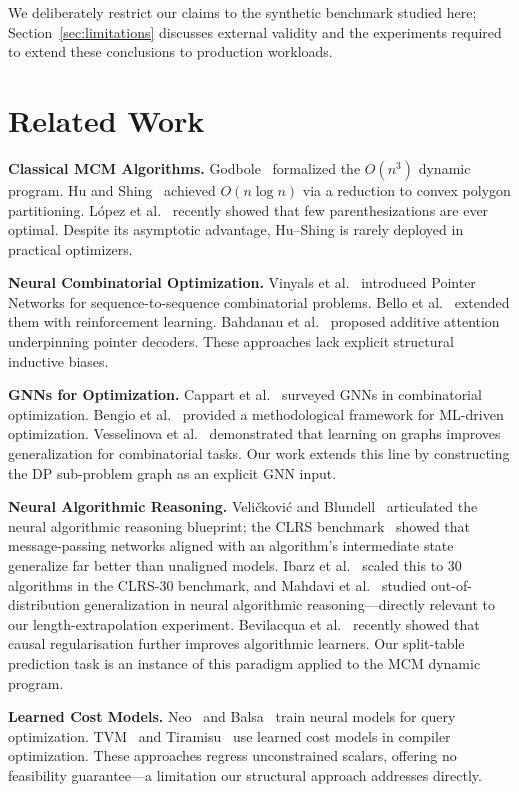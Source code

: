 \documentclass[conference]{IEEEtran}
\begin{document}
We deliberately restrict our claims to the synthetic benchmark studied here;
Section~\ref{sec:limitations} discusses external validity and the experiments
required to extend these conclusions to production workloads.

\section{Related Work}
\textbf{Classical MCM Algorithms.} Godbole~\cite{b1} formalized the $O(n^3)$
dynamic program. Hu and Shing~\cite{b2} achieved $O(n\log n)$ via a reduction
to convex polygon partitioning. L\'{o}pez et al.~\cite{b3} recently showed that
few parenthesizations are ever optimal. Despite its asymptotic advantage,
Hu--Shing is rarely deployed in practical optimizers.

\textbf{Neural Combinatorial Optimization.} Vinyals et al.~\cite{b7} introduced
Pointer Networks for sequence-to-sequence combinatorial problems. Bello
et al.~\cite{b8} extended them with reinforcement learning. Bahdanau
et al.~\cite{b9} proposed additive attention underpinning pointer decoders.
These approaches lack explicit structural inductive biases.

\textbf{GNNs for Optimization.} Cappart et al.~\cite{b20} surveyed GNNs in
combinatorial optimization. Bengio et al.~\cite{b21} provided a methodological
framework for ML-driven optimization. Vesselinova et al.~\cite{b22} demonstrated
that learning on graphs improves generalization for combinatorial tasks. Our work
extends this line by constructing the DP sub-problem graph as an explicit GNN input.

\textbf{Neural Algorithmic Reasoning.} Veli\v{c}kovi\'{c} and
Blundell~\cite{b25} articulated the neural algorithmic reasoning blueprint; the
CLRS benchmark~\cite{b26} showed that message-passing networks aligned with an
algorithm's intermediate state generalize far better than unaligned models.
Ibarz et al.~\cite{b27} scaled this to 30 algorithms in the CLRS-30
benchmark, and Mahdavi et al.~\cite{b28} studied out-of-distribution
generalization in neural algorithmic reasoning---directly relevant to our
length-extrapolation experiment. Bevilacqua et al.~\cite{b29} recently
showed that causal regularisation further improves algorithmic learners.
Our split-table prediction task is an instance of this paradigm applied to the MCM
dynamic program.

\textbf{Learned Cost Models.} Neo~\cite{b17} and Balsa~\cite{b19} train neural
models for query optimization. TVM~\cite{b23} and Tiramisu~\cite{b24} use learned
cost models in compiler optimization. These approaches regress unconstrained
scalars, offering no feasibility guarantee---a limitation our structural approach
addresses directly.
\end{document}
